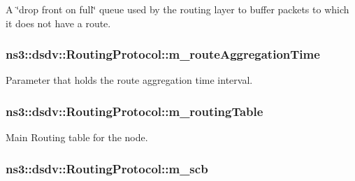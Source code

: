 A \char`\"{}drop front on full\char`\"{} queue used by the routing layer to buffer packets to which it does not have a route. 

\subsubsection[{\texorpdfstring{m\+\_\+route\+Aggregation\+Time}{m_routeAggregationTime}}]{ ns3\+::dsdv\+::\+Routing\+Protocol\+::m\+\_\+route\+Aggregation\+Time\hspace{0.3cm}{\ttfamily [private]}}\hypertarget{classns3_1_1dsdv_1_1RoutingProtocol_a8d7bef939cd3872c1821fc4bce884f8d}{}\label{classns3_1_1dsdv_1_1RoutingProtocol_a8d7bef939cd3872c1821fc4bce884f8d}


Parameter that holds the route aggregation time interval. 

\subsubsection[{\texorpdfstring{m\+\_\+routing\+Table}{m_routingTable}}]{ ns3\+::dsdv\+::\+Routing\+Protocol\+::m\+\_\+routing\+Table\hspace{0.3cm}{\ttfamily [private]}}\hypertarget{classns3_1_1dsdv_1_1RoutingProtocol_acc4cee466c2591e35f508ce58097a00e}{}\label{classns3_1_1dsdv_1_1RoutingProtocol_acc4cee466c2591e35f508ce58097a00e}


Main Routing table for the node. 

\subsubsection[{\texorpdfstring{m\+\_\+scb}{m_scb}}]{ ns3\+::dsdv\+::\+Routing\+Protocol\+::m\+\_\+scb\hspace{0.3cm}{\ttfamily [private]}}\hypertarget{classns3_1_1dsdv_1_1RoutingProtocol_a2ffc78a04da837daca7d5012373ef905}{}\label{classns3_1_1dsdv_1_1RoutingProtocol_a2ffc78a04da837daca7d5012373ef905}


